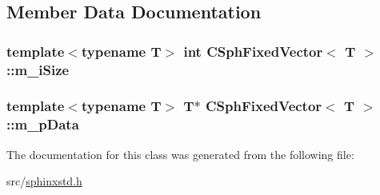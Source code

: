 \subsection{Member Data Documentation}
\hypertarget{classCSphFixedVector_aeb1180497024693b2160fbac1f80b941}{
\subsubsection[{m\-\_\-i\-Size}]{\setlength{\rightskip}{0pt plus 5cm}template$<$typename T$>$ {\bf int} {\bf C\-Sph\-Fixed\-Vector}$<$ T $>$\-::m\-\_\-i\-Size\hspace{0.3cm}{\ttfamily [protected]}}}\label{classCSphFixedVector_aeb1180497024693b2160fbac1f80b941}
\hypertarget{classCSphFixedVector_a672980c14ae13d3bc1045c4f51f179c6}{
\subsubsection[{m\-\_\-p\-Data}]{\setlength{\rightskip}{0pt plus 5cm}template$<$typename T$>$ T$\ast$ {\bf C\-Sph\-Fixed\-Vector}$<$ T $>$\-::m\-\_\-p\-Data\hspace{0.3cm}{\ttfamily [protected]}}}\label{classCSphFixedVector_a672980c14ae13d3bc1045c4f51f179c6}


The documentation for this class was generated from the following file\-:\begin{DoxyCompactItemize}
\item 
src/\hyperlink{sphinxstd_8h}{sphinxstd.\-h}\end{DoxyCompactItemize}
